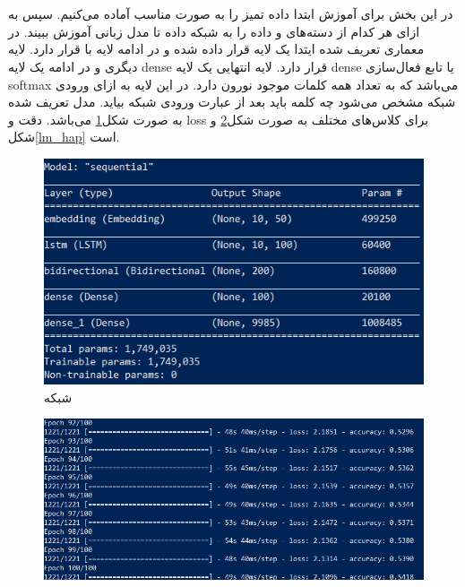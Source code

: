 \documentclass[10pt]{article}
\begin{document}
\newpage
\section{
}

\newpage
\section{
}

\newpage
\section{
	}
	در این بخش برای آموزش 
	ابتدا داده تمیز را به صورت مناسب آماده می‌کنیم. سپس به ازای هر کدام از دسته‌های 
	و
	داده را به شبکه داده تا مدل زبانی آموزش ببیند. در معماری تعریف شده ایتدا یک لایه 
	قرار داده شده و در ادامه لایه 
	با 
	قرار دارد. لایه دیگری
	و در ادامه یک لایه dense قرار دارد. لایه انتهایی یک لایه dense یا تابع فعال‌سازی softmax می‌باشد که به تعداد همه کلمات موجود نورون دارد. در این لایه به ازای ورودی شبکه مشخص می‌شود چه کلمه باید بعد از عبارت ورودی شبکه بیاید.
	مدل تعریف شده به صورت شکل\ref{lm}
	می‌باشد. دقت و loss برای کلاس‌های مختلف به صورت شکل\ref{lm_dep} و شکل\ref{lm_hap} است.
	
	\begin{figure}[ht!]
		\centering\includegraphics[width=\linewidth]{../reports/lm_model.png}
		\caption{شبکه 
			}
		\label{lm}
	\end{figure}
	
	
	\begin{figure}[ht!]
		\centering\includegraphics[width=\linewidth]{../reports/lm_dep.png}
		\caption{ 
			}
		\label{lm_dep}
	\end{figure}
\end{document}
